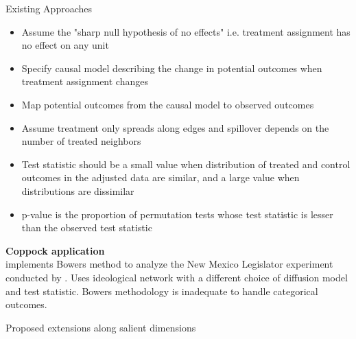 \documentclass[final]{beamer}
\newlength{\onecolwid}
\newlength{\onecolwidd}
\begin{document}
\begin{frame}[t]
\begin{columns}[t]
\begin{column}{\onecolwidd}
\begin{block}{Existing Approaches}
\begin{rmfamily}
	\begin{itemize}
	\item Assume the "sharp null hypothesis of no effects" i.e. treatment assignment has no effect on any unit
	\vspace*{.1in}
	\item Specify causal model describing the change in potential outcomes when treatment assignment changes
	\vspace*{.1in}
	\item  Map potential outcomes from the causal model to observed outcomes
	\vspace*{.1in}
	\item Assume treatment only spreads along edges and spillover depends on the number of treated neighbors
	\vspace*{.1in}	
	\item Test statistic should be a small value when distribution of treated and control outcomes in the adjusted data are similar, and a large value when distributions are dissimilar
	\vspace*{.1in}
	\item p-value is the proportion of permutation tests whose test statistic is lesser than the observed test statistic
	\vspace*{.1in}	
	\end{itemize}
	
	
	\vspace*{10mm}
	{\large \textbf{Coppock application}}\\
	\citealt{coppock2014information} implements Bowers method to analyze the New Mexico Legislator experiment conducted by \citealt{butler2011can}. Uses ideological network with a different choice of diffusion model and test statistic. Bowers methodology is inadequate to handle categorical outcomes.
	
	\end{rmfamily}
	\end{block}
	
	\hspace{2cm}
						
	\vspace*{10mm}
	\begin{block}{Proposed extensions along salient dimensions}
	\begin{rmfamily}
	
	\begin{itemize}
	

\end{itemize}
\end{rmfamily}
\end{block}
\end{column}
\end{columns}
\end{frame}
\end{document}
